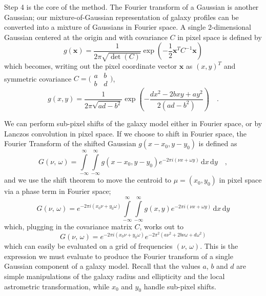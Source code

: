 \documentclass[11pt,preprint]{aastex}
\newcommand{\trick}{method}
\newcommand{\transpose}[1]{#1^{T}}
\newcommand{\pixelfx}{\nu}
\newcommand{\pixelfy}{\omega}
\newcommand{\pixelfreqs}{$(\nu,\, \omega)$}
\begin{document}
Step 4 is the core of the \trick.  The Fourier transform of
a Gaussian is another Gaussian; our mixture-of-Gaussian representation
of galaxy profiles can be converted into a mixture of Gaussians in
Fourier space.
%
A single 2-dimensional Gaussian
centered at the origin and
with covariance $C$
in pixel space is defined by
\begin{equation}
g(\bm{x}) = \frac{1}{2 \pi \sqrt{\det(C)}}
\exp\left( -\frac{1}{2} \transpose{\bm{x}} C^{-1} \bm{x} \right)
\end{equation}
which becomes, writing out the pixel coordinate vector $\bm{x}$
as $\transpose{(x,y)}$
and symmetric covariance $C = \bigl(\begin{smallmatrix}
a&b \\ b&d
\end{smallmatrix} \bigr)$,
\begin{equation}
g(x, y) = \frac{1}{2 \pi \sqrt{a d - b^2}}
\exp \left(
-\frac{d x^2 - 2 b x y + a y^2}{2(a d - b^2)}
\right) \quad .
\end{equation}
%

We can perform sub-pixel shifts of the galaxy model either in Fourier
space, or by Lanczos convolution in pixel space.  If we choose to
shift in Fourier space, the Fourier Transform of the shifted Gaussian
$g(x - x_0, y - y_0)$ is defined as
\begin{equation}
G(\pixelfx,\, \pixelfy) =
\int\limits_{-\infty}^{\infty}
\int\limits_{-\infty}^{\infty}
g(x - x_0, y - y_0) e^{-2 \pi i (\pixelfx x + \pixelfy y)} \, \mathrm{d}x \, \mathrm{d}y
\quad ,
\end{equation}
and we use the shift theorem to move the centroid to $\mu = (x_0, y_0)$
in pixel space via a phase term in Fourier space;
\begin{equation}
G(\pixelfx,\, \pixelfy) =
e^{-2 \pi i (x_0 \pixelfx + y_0 \pixelfy)}
\int\limits_{-\infty}^{\infty}
\int\limits_{-\infty}^{\infty}
g(x, y) e^{-2 \pi i (\pixelfx x + \pixelfy y)} \, \mathrm{d}x \, \mathrm{d}y
\end{equation}
%
which, plugging in the covariance matrix $C$, works out to
\begin{equation}
G(\pixelfx,\, \pixelfy) =
e^{-2 \pi i (x_0 \pixelfx + y_0 \pixelfy)}
e^{-2 \pi^2 (a \pixelfx^2 + 2 b \pixelfx \pixelfy + d \pixelfy^2)}
\label{eq:onegaussian}
\end{equation}
which can easily be evaluated on a grid of frequencies \pixelfreqs.  This
is the expression we must evaluate to produce the Fourier transform of
a single Gaussian component of a galaxy model.  Recall that the values
$a$, $b$ and $d$ are simple manipulations of the galaxy radius and
ellipticity and the local astrometric transformation, while $x_0$ and
$y_0$ handle sub-pixel shifts.
\end{document}
